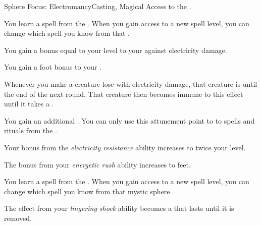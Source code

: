     \begin{feat}{Sphere Focus: Electromancy}{Casting, Magical}
        \featpre Access to the  .

         You learn a spell from the  .
        When you gain access to a new spell level, you can change which spell you know from that .

         You gain a bonus equal to your level to your  against electricity damage.

         You gain a  foot bonus to your .

         Whenever you make a creature lose  with electricity damage, that creature is  until the end of the next round.
        That creature then becomes immune to this effect until it takes a .

         You gain an additional .
        You can only use this attunement point to  to spells and rituals from the  .

         Your bonus from the \textit{electricity resistance} ability increases to twice your level.

         The bonus from your \textit{energetic rush} ability increases to  feet.

         You learn a spell from the  .
        When you gain access to a new spell level, you can change which spell you know from that mystic sphere.

         The  effect from your \textit{lingering shock} ability becomes a  that lasts until it is removed.
    \end{feat}

